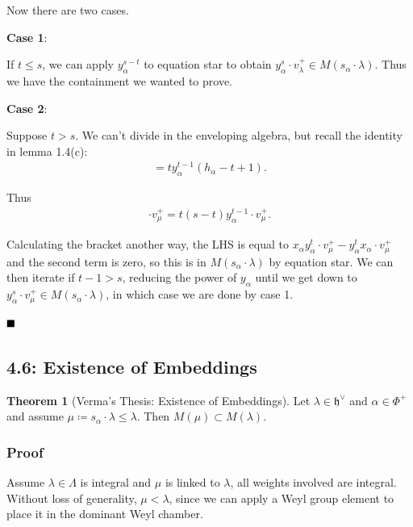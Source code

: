 \documentclass[11pt]{scrartcl}
\theoremstyle{definition}
\theoremstyle{theorem}
\newtheorem{theorem}{Theorem}[section]
\theoremstyle{proof}
\theoremstyle{definition}
\theoremstyle{break}
\theoremstyle{problem}
\DeclarePairedDelimiter\qty{(}{)}
\renewcommand{\qty}[1]{{\left(  {#1} \right)}}
\newcommand{\definedas}[0]{\coloneqq}
\newcommand{\dual}[0]{^\vee}
\newcommand{\lieh}[0]{{\mathfrak{h}}}
\renewcommand{\qed}[0]{\hfill\blacksquare}
\begin{document}
Now there are two cases.

\textbf{Case 1}:

If \(t\leq s\), we can apply \(y_\alpha^{s-t}\) to equation star to
obtain \(y_\alpha^s \cdot v_\lambda^+ \in M(s_\alpha \cdot \lambda)\).
Thus we have the containment we wanted to prove.

\textbf{Case 2}:

Suppose \(t > s\). We can't divide in the enveloping algebra, but recall
the identity in lemma 1.4(c): \begin{align*}
[x_\alpha y_\alpha^t] = t y_\alpha^{t-1} \qty{ h_\alpha - t + 1}
.\end{align*}

Thus \begin{align*}
[x_\alpha y_\alpha^t] \cdot v_\mu^+ = t(s-t) y_\alpha^{t-1} \cdot v_\mu^+
.\end{align*}

Calculating the bracket another way, the LHS is equal to
\(x_\alpha y_\alpha^t \cdot v_\mu^+ - y_\alpha^t x_\alpha \cdot v_\mu^+\)
and the second term is zero, so this is in \(M(s_\alpha \cdot \lambda)\)
by equation star. We can then iterate if \(t-1 > s\), reducing the power
of \(y_\alpha\) until we get down to
\(y_\alpha^s \cdot v_\mu^+ \in M(s_\alpha \cdot \lambda)\), in which
case we are done by case 1.

\(\qed\)

\hypertarget{existence-of-embeddings}{%
\subsection{4.6: Existence of
Embeddings}\label{existence-of-embeddings}}

\begin{theorem}[Verma’s Thesis: Existence of Embeddings]

Let \(\lambda \in \lieh\dual\) and \(\alpha\in\Phi^+\) and assume
\(\mu \definedas s_\alpha \cdot \lambda \leq \lambda\). Then
\(M(\mu) \subset M(\lambda)\).\end{theorem}

\hypertarget{proof}{%
\subsubsection{Proof}\label{proof}}

Assume \(\lambda \in \Lambda\) is integral and \(\mu\) is linked to
\(\lambda\), all weights involved are integral. Without loss of
generality, \(\mu < \lambda\), since we can apply a Weyl group element
to place it in the dominant Weyl chamber.
\end{document}
